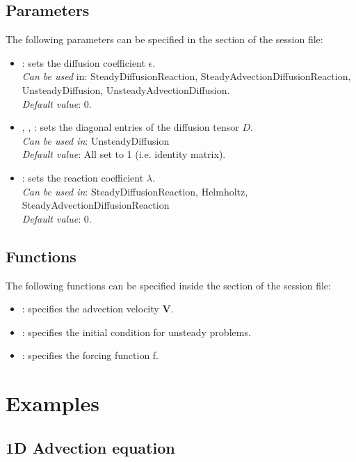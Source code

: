 \subsection{Parameters}

The following parameters can be specified in the  section of
the session file:
\begin{itemize}
\item {}: sets the diffusion coefficient $\epsilon$.\\ 
\textit{Can be used} in: SteadyDiffusionReaction, SteadyAdvectionDiffusionReaction, UnsteadyDiffusion, UnsteadyAdvectionDiffusion. \\
\textit{Default value}: 0.
\item  {}, , : sets the diagonal entries of the
diffusion tensor $D$. \\
\textit{Can be used in}: UnsteadyDiffusion \\
\textit{Default value}: All set to 1 (i.e. identity matrix). 
\item  {}: sets the reaction coefficient  $\lambda$. \\
\textit{Can be used in}: SteadyDiffusionReaction, Helmholtz, SteadyAdvectionDiffusionReaction\\
\textit{Default value}: 0.
\end{itemize}

\subsection{Functions}

The following functions can be specified inside the  section
of the session file:

\begin{itemize}
\item {}: specifies the advection velocity $\mathbf{V}$.
\item {}: specifies the initial condition for unsteady problems.
\item {}: specifies the forcing function f.
\end{itemize}

\section{Examples}

\subsection{1D Advection equation}

